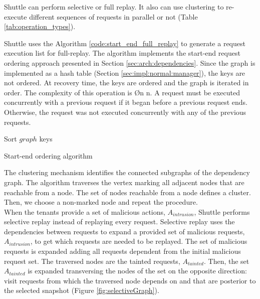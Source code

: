 Shuttle can perform selective or full replay. It also can use clustering to re-execute different sequences of requests in parallel or not (Table \ref{tab:operation_types}).

Shuttle uses the Algorithm \ref{code:start_end_full_replay} to generate a request execution list for full-replay. The algorithm implements the start-end request ordering approach presented in Section \ref{sec:arch:dependencies}. Since the graph is implemented as a hash table (Section \ref{sec:impl:normal:manager}), the keys are not ordered. At recovery time, the keys are ordered and the graph is iterated in order. The complexity of this operation is \O{n \log{} n}. A request must be executed concurrently with a previous request if it began before a previous request ends. Otherwise, the request was not executed concurrently with any of the previous requests.

\begin{algorithm}[H]
\DontPrintSemicolon{}
	  \BlankLine
	  Sort $graph$ keys\;
	  \BlankLine
	\caption{Start-end ordering algorithm}
	\label{code:start_end_full_replay}
\end{algorithm}


The clustering mechanism identifies the connected subgraphs of the dependency graph. The algorithm traverses the vertex marking all adjacent nodes that are reachable from a node. The set of nodes reachable from a node defines a cluster. Then, we choose a non-marked node and repeat the procedure.\\

When the tenants provide a set of malicious actions, $A_{intrusion}$, Shuttle performs selective replay instead of replaying every request. Selective replay uses the dependencies between requests to expand a provided set of malicious requests, $A_{intrusion}$,  to get which requests are needed to be replayed. The set of malicious requests is expanded adding all requests dependent from the initial malicious request set. The traversed nodes are the tainted requests, $A_{tainted}$. Then, the set $A_{tainted}$ is expanded transversing the nodes of the set on the opposite direction: visit requests from which the traversed node depends on and that are posterior to the selected snapshot (Figure \ref{fig:selectiveGraph}). 


